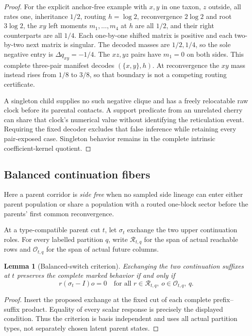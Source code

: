 \documentclass[11pt]{article}
\newtheorem{lemma}[theorem]{Lemma}
\begin{document}
\begin{proof}
For the explicit anchor-free example with $x,y$ in one taxon, $z$ outside, all rates one, inheritance $1/2$, routing $h=\log2$, reconvergence $2\log2$ and root $3\log2$, the $xy$ left moments $m_1,\ldots,m_4$ at $h$ are all $1/2$, and their right counterparts are all $1/4$.  Each one-by-one shifted matrix is positive and each two-by-two next matrix is singular.  The decoded masses are $1/2,1/4$, so the sole negative entry is $\Delta q_{xy}=-1/4$.  The $xz,yz$ pairs have $m_1=0$ on both sides.  This complete three-pair manifest decodes $(\{x,y\},h)$.  At reconvergence the $xy$ mass instead rises from $1/8$ to $3/8$, so that boundary is not a competing routing certificate.

A singleton child supplies no such negative clique and has a freely relocatable raw clock before its parental contacts.  A support predicate from an unrelated cherry can share that clock's numerical value without identifying the reticulation event.  Requiring the fixed decoder excludes that false inference while retaining every pair-exposed case.  Singleton behavior remains in the complete intrinsic coefficient-kernel quotient.
\end{proof}

\subsection{Balanced continuation fibers}

Here a parent corridor is \emph{side free} when no sampled side lineage can enter either parent population or share a population with a routed one-block sector before the parents' first common reconvergence.

At a type-compatible parent cut $t$, let $\sigma_t$ exchange the two upper continuation roles.  For every labelled partition $q$, write $\mathcal R_{t,q}$ for the span of actual reachable rows and $\mathcal O_{t,q}$ for the span of actual future columns.

\begin{lemma}[Balanced-switch criterion]
Exchanging the two continuation suffixes at $t$ preserves the complete marked behavior if and only if
\[
r(\sigma_t-I)o=0
\quad\text{for all }r\in\mathcal R_{t,q},\ o\in\mathcal O_{t,q},\ q.
\]
\end{lemma}

\begin{proof}
Insert the proposed exchange at the fixed cut of each complete prefix--suffix product.  Equality of every scalar response is precisely the displayed condition.  Thus the criterion is basis independent and uses all actual partition types, not separately chosen latent parent states.
\end{proof}
\end{document}
